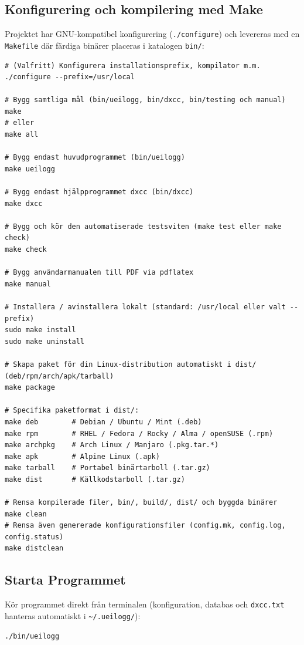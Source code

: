\documentclass[11pt,a4paper]{article}
\begin{document}
\subsection{Konfigurering och kompilering med Make}
Projektet har GNU-kompatibel konfigurering (\texttt{./configure}) och levereras med en \texttt{Makefile} där färdiga binärer placeras i katalogen \texttt{bin/}:

\begin{verbatim}
# (Valfritt) Konfigurera installationsprefix, kompilator m.m.
./configure --prefix=/usr/local

# Bygg samtliga mål (bin/ueilogg, bin/dxcc, bin/testing och manual)
make
# eller
make all

# Bygg endast huvudprogrammet (bin/ueilogg)
make ueilogg

# Bygg endast hjälpprogrammet dxcc (bin/dxcc)
make dxcc

# Bygg och kör den automatiserade testsviten (make test eller make check)
make check

# Bygg användarmanualen till PDF via pdflatex
make manual

# Installera / avinstallera lokalt (standard: /usr/local eller valt --prefix)
sudo make install
sudo make uninstall

# Skapa paket för din Linux-distribution automatiskt i dist/ (deb/rpm/arch/apk/tarball)
make package

# Specifika paketformat i dist/:
make deb        # Debian / Ubuntu / Mint (.deb)
make rpm        # RHEL / Fedora / Rocky / Alma / openSUSE (.rpm)
make archpkg    # Arch Linux / Manjaro (.pkg.tar.*)
make apk        # Alpine Linux (.apk)
make tarball    # Portabel binärtarboll (.tar.gz)
make dist       # Källkodstarboll (.tar.gz)

# Rensa kompilerade filer, bin/, build/, dist/ och byggda binärer
make clean
# Rensa även genererade konfigurationsfiler (config.mk, config.log, config.status)
make distclean
\end{verbatim}

\subsection{Starta Programmet}
Kör programmet direkt från terminalen (konfiguration, databas och \texttt{dxcc.txt} hanteras automatiskt i \texttt{\textasciitilde/.ueilogg/}):
\begin{verbatim}
./bin/ueilogg
\end{verbatim}
\end{document}
